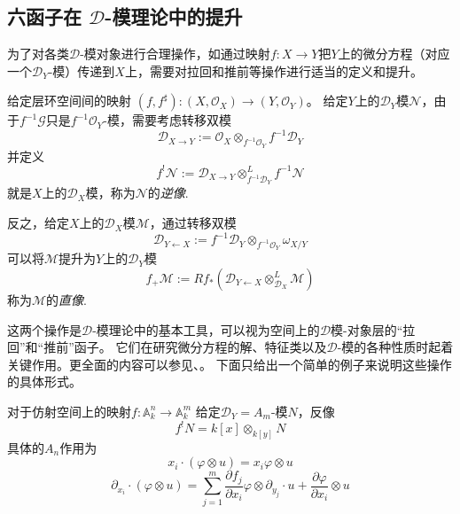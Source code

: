 \documentclass[12pt,a4paper]{ctexrep}   %
\begin{document}
\subsection{六函子在 $\mathcal{D}$-模理论中的提升}

为了对各类$\mathcal{D}$-模对象进行合理操作，如通过映射$f:X\to Y$把$Y$上的微分方程（对应一个$\mathcal{D}_Y$-模）传递到$X$上，需要对拉回和推前等操作进行适当的定义和提升。

给定层环空间间的映射 $\left(f,f^\sharp \right):\left(X,\mathcal{O}_X\right) \to \left(Y,\mathcal{O}_Y\right)$。
给定$Y$上的$\mathcal{D}_Y$模$\mathcal{N}$，由于$f^{-1}\mathcal{G}$只是$f^{-1}\mathcal{O}_Y$-模，需要考虑转移双模
\begin{equation*}
    \mathcal{D}_{X\to Y}
    :=
    \mathcal{O}_X\otimes_{f^{-1}\mathcal{O}_Y} f^{-1}\mathcal{D}_Y
\end{equation*}
并定义
\begin{equation*}
    f^!\mathcal{N}
    :=
    \mathcal{D}_{X\to Y}\otimes_{f^{-1}\mathcal{D}_Y}^L f^{-1}\mathcal{N}
\end{equation*}
就是$X$上的$\mathcal{D}_X$模，称为$\mathcal{N}$的\emph{逆像}.

反之，给定$X$上的$\mathcal{D}_X$模$\mathcal{M}$，通过转移双模
\begin{equation*}
    \mathcal{D}_{Y\leftarrow X}
    :=
    f^{-1}\mathcal{D}_Y\otimes_{f^{-1}\mathcal{O}_Y}\omega_{X/Y}
\end{equation*}
可以将$\mathcal{M}$提升为$Y$上的$\mathcal{D}_Y$模
\begin{equation*}
    f_+\mathcal{M}
    :=
    Rf_*(\mathcal{D}_{Y\leftarrow X}\otimes^L_{\mathcal{D}_X}\mathcal{M})
\end{equation*}
称为$\mathcal{M}$的\emph{直像}.

这两个操作是$\mathcal{D}$-模理论中的基本工具，可以视为空间上的$\mathcal{D}$模-对象层的“拉回”和“推前”函子。 它们在研究微分方程的解、特征类以及$\mathcal{D}$-模的各种性质时起着关键作用。更全面的内容可以参见\cite{gallauer2021introduction}、\cite{kashiwara2013sheaves}。
下面只给出一个简单的例子来说明这些操作的具体形式。

\begin{example}
    对于仿射空间上的映射$f:\mathbb{A}_k^n \to \mathbb{A}_k^m$ 给定$\mathcal{D}_Y=A_m$-模$N$，反像
    \begin{equation*}
        f^!N= k[x]\otimes_{k[y]}N
    \end{equation*}
    具体的$A_n$作用为
    \begin{equation*}
        x_i\cdot (\varphi\otimes u)
        =
        x_i\varphi\otimes u
    \end{equation*}
    \begin{equation*}
        \partial_{x_i}\cdot (\varphi\otimes u)
        =
        \sum_{j=1}^m \frac{\partial f_j}{\partial x_i} \varphi\otimes \partial_{y_j}\cdot u
        +
        \frac{\partial \varphi}{\partial x_i}\otimes u
    \end{equation*}

\end{example}
\end{document}
